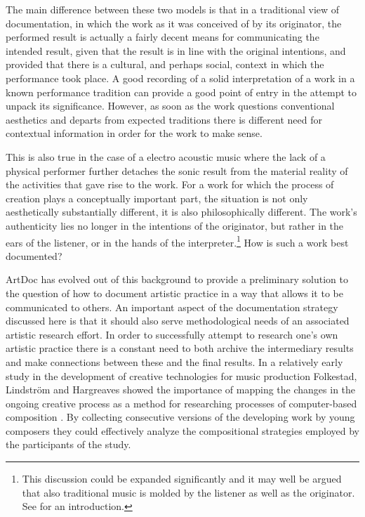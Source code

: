 \documentclass[,a4paper]{llncs}
\begin{document}
The main difference between these two models is that in a traditional view of documentation, in which the work as it was conceived of by its originator, the performed result is actually a fairly decent means for communicating the intended result, given that the result is in line with the original intentions, and provided that there is a cultural, and perhaps social, context in which the performance took place. A good recording of a solid interpretation of a work in a known performance tradition can provide a good point of entry in the attempt to unpack its significance. However, as soon as the work questions conventional aesthetics and departs from expected traditions there is different need for contextual information in order for the work to make sense. 

This is also true in the case of a electro acoustic music where the lack of a physical performer further detaches the sonic result from the material reality of the activities that gave rise to the work. For a work for which the process of creation plays a conceptually important part, the situation is not only aesthetically substantially different, it is also philosophically different. The work's authenticity lies no longer in the intentions of the originator, but rather in the ears of the listener, or in the hands of the interpreter.\footnote{This discussion could be expanded significantly and it may well be argued that also traditional music is molded by the listener as well as the originator. See \cite{frisk-ost06-2} for an introduction.} How is such a work best documented?

ArtDoc has evolved out of this background to provide a preliminary solution to the question of how to document artistic practice in a way that allows it to be communicated to others. An important aspect of the documentation strategy discussed here is that it should also serve methodological needs of an associated artistic research effort. In order to successfully attempt to research one's own artistic practice there is a constant need to both archive the intermediary results and make connections between these and the final results. In a relatively early study in the development of creative technologies for music production Folkestad, Lindstr{\"o}m and Hargreaves showed the importance of mapping the changes in the ongoing creative process as a method for researching processes of computer-based composition \cite{Folkestad1997}. By collecting consecutive versions of the developing work by young composers they could effectively analyze the compositional strategies employed by the participants of the study.
\end{document}
